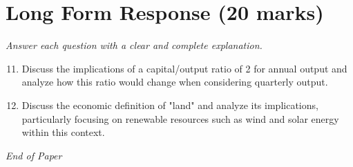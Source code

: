 \documentclass[12pt]{article}
\begin{document}
\section*{Long Form Response (20 marks)}
\textit{Answer each question with a clear and complete explanation.}
\begin{enumerate}[label=\arabic*.]
\setcounter{enumi}{10}
\item Discuss the implications of a capital/output ratio of 2 for annual output and analyze how this ratio would change when considering quarterly output.
\item Discuss the economic definition of "land" and analyze its implications, particularly focusing on renewable resources such as wind and solar energy within this context.
\end{enumerate}

\vfill
\noindent\textit{End of Paper}
\end{document}
